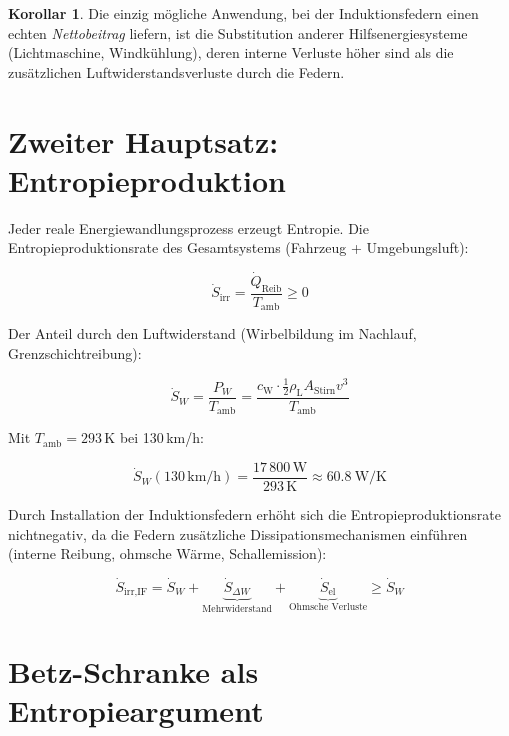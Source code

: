 ﻿\documentclass[12pt, a4paper]{report}
\theoremstyle{definition}
\newtheorem{korollar}[theorem]{Korollar}
\theoremstyle{remark}
\newcommand{\rhoL}{\rho_{\text{L}}}
\newcommand{\cW}{c_{\text{W}}}
\newcommand{\Astirnfl}{A_{\text{Stirn}}}
\begin{document}
\begin{korollar}
  Die einzig mögliche Anwendung, bei der Induktionsfedern einen echten
  \emph{Nettobeitrag} liefern, ist die Substitution anderer Hilfsenergiesysteme
  (Lichtmaschine, Windkühlung), deren interne Verluste höher sind als die
  zusätzlichen Luftwiderstandsverluste durch die Federn.
\end{korollar}

\section{Zweiter Hauptsatz: Entropieproduktion}

Jeder reale Energiewandlungsprozess erzeugt Entropie. Die Entropie\-produktions\-rate
des Gesamtsystems (Fahrzeug + Umgebungsluft):

\begin{equation}
  \dot{S}_{\text{irr}} = \frac{\dot{Q}_{\text{Reib}}}{T_{\text{amb}}} \geq 0
  \label{eq:s_irr}
\end{equation}

Der Anteil durch den Luftwiderstand (Wirbelbildung im Nachlauf,
Grenzschichtreibung):

\begin{equation}
  \dot{S}_{W} = \frac{P_W}{T_{\text{amb}}} = \frac{\cW \cdot \frac{1}{2}\rhoL \Astirnfl v^3}{T_{\text{amb}}}
  \label{eq:s_lw}
\end{equation}

Mit $T_{\text{amb}} = 293\,\text{K}$ bei 130\,km/h:

\begin{equation}
  \dot{S}_{W}(130\,\text{km/h}) = \frac{17\,800\,\text{W}}{293\,\text{K}}
  \approx \SI{60.8}{\watt\per\kelvin}
  \label{eq:s_lw_130}
\end{equation}

Durch Installation der Induktionsfedern erhöht sich die Entropieproduktionsrate
nicht\-negativ, da die Federn zusätzliche Dissipationsmechanismen einführen
(interne Reibung, ohmsche Wärme, Schallemission):

\begin{equation}
  \dot{S}_{\text{irr,IF}} = \dot{S}_W + \underbrace{\dot{S}_{\Delta W}}_{\text{Mehrwiderstand}}
  + \underbrace{\dot{S}_{\text{el}}}_{\text{Ohmsche Verluste}} \geq \dot{S}_W
  \label{eq:s_irr_if}
\end{equation}

\section{Betz-Schranke als Entropieargument}
\end{document}
